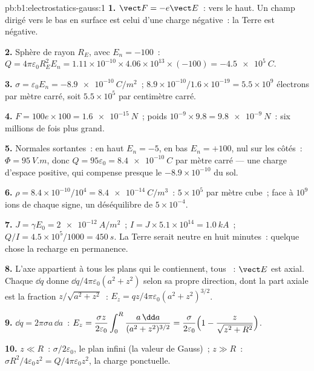 \begin{solution}{pb:b1:electrostatics-gauss:1}
\textbf{1.} $\vect F = -e\vect E$~: vers le haut. Un champ dirigé vers le bas
en surface est celui d'une charge négative~: la Terre est négative.

\textbf{2.} Sphère de rayon $R_E$, avec $E_n = -100$~: $Q = 4\pi\varepsilon_0R_E^2E_n =
1.11 \times 10^{-10} \times 4.06 \times 10^{13} \times (-100) = \qty{-4.5e5}{C}$.

\textbf{3.} $\sigma = \varepsilon_0E_n = \qty{-8.9e-10}{C/m^2}$~; $8.9 \times 10^{-10}/1.6 \times
10^{-19} = 5.5 \times 10^9$ électrons par mètre carré, soit $5.5 \times 10^5$ par
centimètre carré.

\textbf{4.} $F = 100e \times 100 = \qty{1.6e-15}{N}$~; poids $10^{-9} \times 9.8 =
\qty{9.8e-9}{N}$~: six millions de fois plus grand.

\textbf{5.} Normales sortantes~: en haut $E_n = -5$, en bas $E_n = +100$, nul
sur les côtés~: $\Phi = \qty{95}{V.m}$, donc $Q = 95\varepsilon_0 = \qty{+8.4e-10}{C}$ par
mètre carré --- une charge d'espace positive, qui compense presque le
$-8.9 \times 10^{-10}$ du sol.

\textbf{6.} $\rho = 8.4 \times 10^{-10}/10^4 = \qty{8.4e-14}{C/m^3}$~: $5 \times 10^5$
 par mètre cube~; face à $10^9$ ions de chaque signe, un
déséquilibre de $5 \times 10^{-4}$.

\textbf{7.} $J = \gamma E_0 = \qty{2e-12}{A/m^2}$~; $I = J \times 5.1 \times 10^{14} =
\qty{1.0}{kA}$~; $Q/I = 4.5 \times 10^5/1000 = \qty{450}{s}$. La Terre serait
neutre en huit minutes~: quelque chose la recharge en permanence.

\textbf{8.} L'axe appartient à tous les plans qui le contiennent, tous ~: $\vect E$ est axial. Chaque $\dd q$ donne $\dd q/4\pi\varepsilon_0(a^2 + z^2)$
selon sa propre direction, dont la part axiale est la fraction
$z/\sqrt{a^2 + z^2}$~: $E_z = qz/4\pi\varepsilon_0(a^2 + z^2)^{3/2}$.

\textbf{9.} $\dd q = 2\pi\sigma a\,\dd a$~: $E_z = \dfrac{\sigma z}{2\varepsilon_0}\displaystyle\int_0^R
\dfrac{a\,\dd a}{(a^2 + z^2)^{3/2}} = \dfrac{\sigma}{2\varepsilon_0}\Bigl(1 - \dfrac{z}{\sqrt{z^2
+ R^2}}\Bigr)$.

\textbf{10.} $z \ll R$~: $\sigma/2\varepsilon_0$, le plan infini (la valeur de Gauss)~;
$z \gg R$~: $\sigma R^2/4\varepsilon_0z^2 = Q/4\pi\varepsilon_0z^2$, la charge ponctuelle.


\end{solution}
